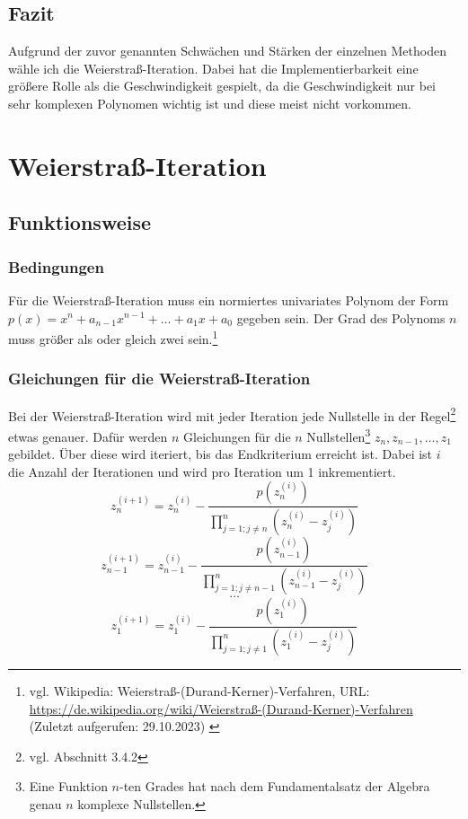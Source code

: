 \documentclass[12pt]{article}
\begin{document}
\subsection{Fazit}
Aufgrund der zuvor genannten Schwächen und Stärken der einzelnen Methoden wähle ich die Weierstraß-Iteration. Dabei hat die Implementierbarkeit eine größere Rolle als die Geschwindigkeit gespielt, da die Geschwindigkeit nur bei sehr komplexen Polynomen wichtig ist und diese meist nicht vorkommen.

\section{Weierstraß-Iteration}
\subsection{Funktionsweise}
\subsubsection{Bedingungen}
Für die Weierstraß-Iteration muss ein normiertes univariates Polynom der Form $p(x) = x^n + a_{n-1} x^{n-1} + \dots + a_1 x + a_0$ gegeben sein. Der Grad des Polynoms $n$ muss größer als oder gleich zwei sein.\footnote{
    vgl. Wikipedia: Weierstraß-(Durand-Kerner)-Verfahren, URL: \url{https://de.wikipedia.org/wiki/Weierstraß-(Durand-Kerner)-Verfahren} (Zuletzt aufgerufen: 29.10.2023)
    \label{ftn:Wikipedia-Weierstraß-Methode}
}

\subsubsection{Gleichungen für die Weierstraß-Iteration}
Bei der Weierstraß-Iteration wird mit jeder Iteration jede Nullstelle in der Regel\footnote{
    vgl. Abschnitt 3.4.2
} etwas genauer. Dafür werden $n$ Gleichungen für die $n$ Nullstellen\footnote{
    Eine Funktion $n$-ten Grades hat nach dem Fundamentalsatz der Algebra genau $n$ komplexe Nullstellen.
} $z_n,z_{n-1},\dots,z_1$ gebildet. Über diese wird iteriert, bis das Endkriterium erreicht ist. Dabei ist $i$ die Anzahl der Iterationen und wird pro Iteration um 1 inkrementiert.
\[z_n^{(i+1)} = z_n^{(i)} - \frac{p(z_n^{(i)})}{\prod_{j=1;j\neq n}^{n}(z_n^{(i)}-z_j^{(i)})}\]
\[z_{n-1}^{(i+1)} = z_{n-1}^{(i)} - \frac{p(z_{n-1}^{(i)})}{\prod_{j=1;j\neq n-1}^{n}(z_{n-1}^{(i)}-z_j^{(i)})}\]
\vspace{0.25mm}
\[\dots\]
\[z_{1}^{(i+1)} = z_1^{(i)} - \frac{p(z_{1}^{(i)})}{\prod_{j=1;j\neq 1}^{n}(z_{1}^{(i)}-z_j^{(i)})}\]
\end{document}
